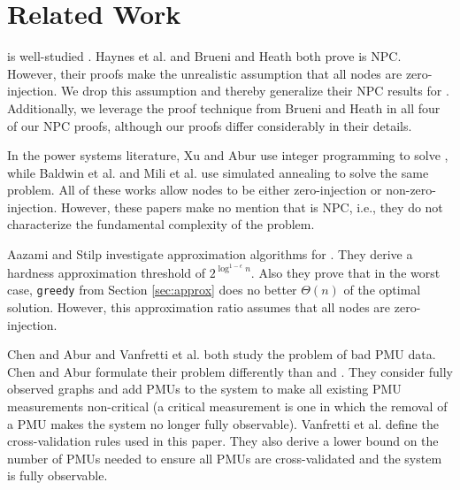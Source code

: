 \section{Related Work}
\label{sec:related}

\full is well-studied \cite{Baldwin93,Brueni05,Haynes02, Mili90, Xu04}.  
Haynes et al. \cite{Haynes02} and Brueni and Heath \cite{Brueni05} both prove \full is NPC.  
However, their proofs make the unrealistic assumption that all nodes are zero-injection.  We drop this assumption and thereby generalize their NPC results for \fulls.
Additionally, we leverage the proof technique from Brueni and Heath \cite{Brueni05} in all four of our NPC proofs, although our proofs
differ considerably in their details. 

In the power systems literature, Xu and Abur \cite{Xu04,Xu05} use integer programming to solve \fulls, while Baldwin et al. \cite{Baldwin93} and Mili et al. \cite{Mili90} use simulated annealing 
to solve the same problem. All of these works allow nodes to be either zero-injection or non-zero-injection.  However,
these papers make no mention that \full is NPC, i.e., they do not characterize the fundamental complexity of the problem. 

Aazami and Stilp \cite{Aazami07} investigate approximation algorithms for \fulls.  They derive a hardness approximation threshold of $2^{\log^{1 -\epsilon}n}$.
Also they prove that in the worst case, {\tt greedy} from Section \ref{sec:approx} does no better $\Theta(n)$ of the optimal solution.  However, this approximation ratio assumes that 
all nodes are zero-injection.

Chen and Abur \cite{Abur06} and Vanfretti et al. \cite{Vanfretti10} both study the problem of bad PMU data. Chen and Abur \cite{Abur06} formulate their problem differently than \xval and \xvalparts.  
They consider fully observed graphs and add PMUs to the system to make all existing PMU measurements non-critical 
(a critical measurement is one in which the removal of a PMU makes the system
no longer fully observable). Vanfretti et al. \cite{Vanfretti10} define the cross-validation rules used in this paper.  They also derive a
lower bound on the number of PMUs needed to ensure all PMUs are cross-validated and the system is fully observable. 

